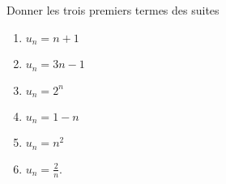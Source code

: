 
\begin{exercice}\label{exosmath-0158}

Donner les trois premiers termes des suites
\begin{multicols}{3}
    \begin{enumerate}
        \item
            \( u_n=n+1\)
        \item
            \( u_n=3n-1\)
        \item
            \( u_n=2^n\)
        \item
            \( u_n=1-n\)
        \item
            \( u_n=n^2\)
        \item
            \( u_n=\frac{ 2 }{ n }\).
    \end{enumerate}
\end{multicols}

\end{exercice}
